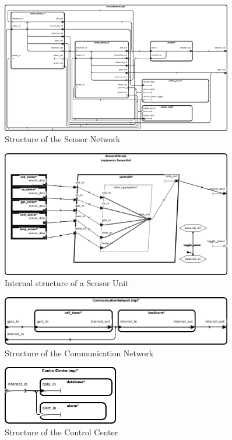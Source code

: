 \begin{figure}[h]
\caption{Structure of the Sensor Network}
\label{fig:sensornetwork}
\centering
\includegraphics[width=0.9\textwidth]{SensorNetwork}
\end{figure}

\begin{figure}[h]
\caption{Internal structure of a Sensor Unit}
\label{fig:sensorunit}
\centering
\includegraphics[width=0.9\textwidth]{SensorUnit}
\end{figure}

\begin{figure}[h]
\caption{Structure of the Communication Network}
\label{fig:communicationnetwork}
\centering
\includegraphics[width=0.9\textwidth]{CommunicationNetwork}
\end{figure}

\begin{figure}[h]
\caption{Structure of the Control Center}
\label{fig:controlcenter}
\centering
\includegraphics[width=0.45\textwidth]{ControlCenter}
\end{figure}

